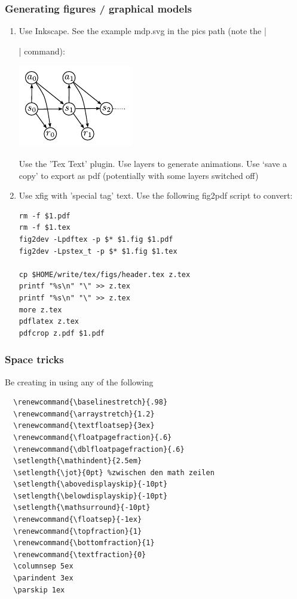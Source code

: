 \subsubsection{Generating figures / graphical models}

\begin{enumerate}

\item Use Inkscape. See the example mdp.svg in the pics path (note
the |\graphicspath{{pics/}}| command):

\centerline{\includegraphics[scale=.5]{mdp}}


  Use the 'Tex Text' plugin. Use layers to generate animations. Use
  `save a copy' to export as pdf (potentially with some layers
  switched off)

\item Use xfig with 'special tag' text. Use the following fig2pdf script to
  convert:

\begin{code}
\begin{verbatim}
rm -f $1.pdf
rm -f $1.tex
fig2dev -Lpdftex -p $* $1.fig $1.pdf
fig2dev -Lpstex_t -p $* $1.fig $1.tex

cp $HOME/write/tex/figs/header.tex z.tex
printf "%s\n" "\" >> z.tex
printf "%s\n" "\" >> z.tex
more z.tex
pdflatex z.tex
pdfcrop z.pdf $1.pdf
\end{verbatim}
\end{code}
\end{enumerate}



\subsubsection{Space tricks}

Be creating in using any of the following\\
\begin{code}
\begin{verbatim}
  \renewcommand{\baselinestretch}{.98}
  \renewcommand{\arraystretch}{1.2}
  \renewcommand{\textfloatsep}{3ex}
  \renewcommand{\floatpagefraction}{.6}
  \renewcommand{\dblfloatpagefraction}{.6}
  \setlength{\mathindent}{2.5em}
  \setlength{\jot}{0pt} %zwischen den math zeilen
  \setlength{\abovedisplayskip}{-10pt}
  \setlength{\belowdisplayskip}{-10pt}
  \setlength{\mathsurround}{-10pt}
  \renewcommand{\floatsep}{-1ex}
  \renewcommand{\topfraction}{1}
  \renewcommand{\bottomfraction}{1}
  \renewcommand{\textfraction}{0}
  \columnsep 5ex
  \parindent 3ex
  \parskip 1ex
\end{verbatim}
\end{code}

